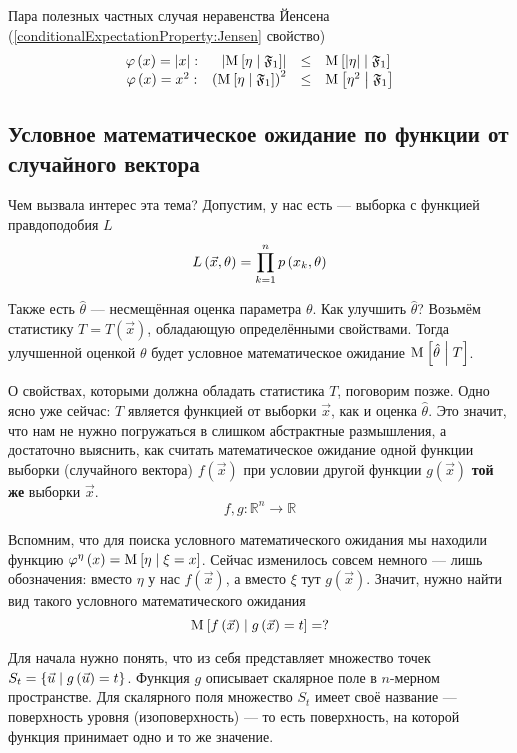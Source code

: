 Пара полезных частных случая неравенства Йенсена
(\ref{conditionalExpectationProperty:Jensen} свойство)
$$\begin{array}{crcl}
  \varphi\left( x \right) = \left|x\right|:&
      \left| \operatorname{M}_{} \left[ \eta \;\middle|\; \mathfrak{F}_1 \right] \right|
      &\le& \operatorname{M}_{} \left[ \left| \eta \right| \;\middle|\; \mathfrak{F}_1 \right] \\
  \varphi\left( x \right) = x^2:&
      \left( \operatorname{M}_{} \left[ \eta \;\middle|\; \mathfrak{F}_1 \right] \right)^2
      &\le& \operatorname{M}_{} \left[ \eta^2 \;\middle|\; \mathfrak{F}_1 \right]
\end{array}$$

\subsection{Условное математическое ожидание по функции
  от случайного вектора}\label{conditionalExpectationSubsection}

Чем вызвала интерес эта тема?
Допустим, у нас есть \xsample --- выборка с функцией правдоподобия $L$
$$L\left( \vec{x}, \theta \right) = \prod_{k=1}^n p\left(x_k, \theta\right)$$

Также есть $\hat{\theta}$ --- несмещённая оценка параметра $\theta$.
Как улучшить $\hat{\theta}$?
Возьмём статистику $T = T\left( \vec{x} \right)$,
обладающую определёнными свойствами.
Тогда улучшенной оценкой $\theta$ будет условное математическое ожидание
$\operatorname{M}_{} \left[  \hat{\theta} \;\middle|\; T  \right]$.

О свойствах, которыми должна обладать статистика $T$, поговорим позже.
Одно ясно уже сейчас: $T$ является функцией от выборки $\vec{x}$,
как и оценка $\hat{\theta}$.
Это значит, что нам не нужно погружаться в слишком абстрактные размышления,
а достаточно выяснить, как считать математическое ожидание
одной функции выборки (случайного вектора) $f\left( \vec{x} \right)$
при условии другой функции $g\left( \vec{x} \right)$
\textbf{той же} выборки $\vec{x}$.
$$f,g: \mathbb{R}^n \rightarrow \mathbb{R}$$

Вспомним, что для поиска условного математического ожидания
мы находили функцию
$\varphi^{\eta}\left( x \right) = \operatorname{M}_{} \left[  \eta \;\middle|\; \xi = x  \right]$.
Сейчас изменилось совсем немного --- лишь обозначения:
вместо $\eta$ у нас $f\left( \vec{x} \right)$,
а вместо $\xi$ тут $g\left( \vec{x} \right)$.
Значит, нужно найти вид такого условного математического ожидания
$$\operatorname{M}_{} \left[ f\left( \vec{x} \right) \;\middle|\; g\left( \vec{x} \right) = t \right] = ?$$

Для начала нужно понять, что из себя представляет множество точек
$S_t = \left\{ \vec{u} \;\middle|\; g\left( \vec{u} \right) = t \right\}$.
Функция $g$ описывает скалярное поле в $n$-мерном пространстве.
Для скалярного поля множество $S_t$
имеет своё название --- поверхность уровня (изоповерхность) --- то есть
поверхность, на которой функция принимает одно и то же значение.


